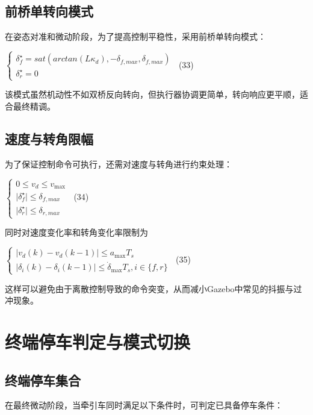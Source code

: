 \subsection{前桥单转向模式}

在姿态对准和微动阶段，为了提高控制平稳性，采用前桥单转向模式：

\(\left\{ \begin{array}{r}
\delta_{f}^{\star} = sat\left( arctan(L\kappa_{d}), - \delta_{f,max},\delta_{f,max} \right) \\
\delta_{r}^{\star} = 0
\end{array} \right.\ \) (33)

该模式虽然机动性不如双桥反向转向，但执行器协调更简单，转向响应更平顺，适合最终精调。

\subsection{速度与转角限幅}

为了保证控制命令可执行，还需对速度与转角进行约束处理：

\(\left\{ \begin{array}{r}
0 \leq v_{d} \leq v_{\max} \\
 \mid \delta_{f}^{\star} \mid \leq \delta_{f,max} \\
 \mid \delta_{r}^{\star} \mid \leq \delta_{r,max}
\end{array} \right.\ \) (34)

同时对速度变化率和转角变化率限制为

\(\left\{ \begin{array}{r}
 \mid v_{d}(k) - v_{d}(k - 1) \mid \leq a_{\max}T_{s} \\
 \mid \delta_{i}(k) - \delta_{i}(k - 1) \mid \leq {\dot{\delta}}_{\max}T_{s},i \in \{ f,r\}
\end{array} \right.\ \) (35)

这样可以避免由于离散控制导致的命令突变，从而减小Gazebo中常见的抖振与过冲现象。

\section{终端停车判定与模式切换}

\subsection{终端停车集合}

在最终微动阶段，当牵引车同时满足以下条件时，可判定已具备停车条件：

